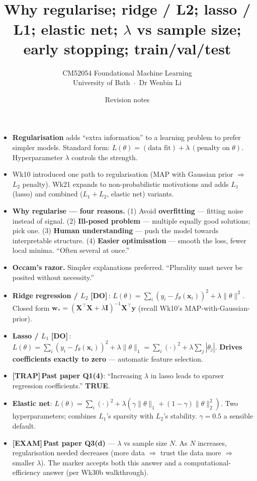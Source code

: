 \documentclass[11pt, a4paper]{article}
\title{\vspace{-1cm}{\Huge\bfseries Week 21 — Regularisation} \\[0.4em]{\large Why regularise; ridge / L2; lasso / L1; elastic net; $\lambda$ vs sample size; early stopping; train/val/test}}
\author{\large CM52054 Foundational Machine Learning \\[0.2em]\normalsize University of Bath \,$\cdot$\, Dr Wenbin Li}
\date{Revision notes}
\newcommand{\examflag}{\textcolor{tipBd}{\textbf{[EXAM]}}\,}
\newcommand{\trapflag}{\textcolor{trapBd}{\textbf{[TRAP]}}\,}
\newcommand{\doflag}{\textcolor{defBd}{\textbf{[DO]}}\,}
\begin{document}
\maketitle\thispagestyle{empty}\vspace{1em}

\begin{tldrbox}
\begin{itemize}[leftmargin=*]
  \item \textbf{Regularisation} adds ``extra information'' to a learning problem to prefer simpler models. Standard form: $L(\theta) = (\text{data fit}) + \lambda\,(\text{penalty on }\theta)$. Hyperparameter $\lambda$ controls the strength.
  \item Wk10 introduced one path to regularisation (MAP with Gaussian prior $\Rightarrow$ $L_2$ penalty). Wk21 expands to non-probabilistic motivations and adds $L_1$ (lasso) and combined ($L_1+L_2$, elastic net) variants.
  \item \textbf{Why regularise — four reasons.} (1) Avoid \textbf{overfitting} — fitting noise instead of signal. (2) \textbf{Ill-posed problem} — multiple equally good solutions; pick one. (3) \textbf{Human understanding} — push the model towards interpretable structure. (4) \textbf{Easier optimisation} — smooth the loss, fewer local minima. ``Often several at once.''
  \item \textbf{Occam's razor.} Simpler explanations preferred. ``Plurality must never be posited without necessity.''
  \item \textbf{Ridge regression / $L_2$} \doflag{}: $L(\theta) = \sum_i(y_i - f_\theta(\mathbf{x}_i))^2 + \lambda\|\theta\|^2$. Closed form $\mathbf{w}_* = (\mathbf{X}^\top\mathbf{X} + \lambda\mathbf{I})^{-1}\mathbf{X}^\top\mathbf{y}$ (recall Wk10's MAP-with-Gaussian-prior).
  \item \textbf{Lasso / $L_1$} \doflag{}: $L(\theta) = \sum_i(y_i - f_\theta(\mathbf{x}_i))^2 + \lambda\|\theta\|_1 = \sum_i(\cdot)^2 + \lambda\sum_j|\theta_j|$. \textbf{Drives coefficients exactly to zero} — automatic feature selection.
  \item \trapflag{}\textbf{Past paper Q1(4)}: ``Increasing $\lambda$ in lasso leads to sparser regression coefficients.'' \textbf{TRUE}.
  \item \textbf{Elastic net}: $L(\theta) = \sum_i(\cdot)^2 + \lambda(\gamma\|\theta\|_1 + (1-\gamma)\|\theta\|_2^2)$. Two hyperparameters; combines $L_1$'s sparsity with $L_2$'s stability. $\gamma=0.5$ a sensible default.
  \item \examflag{}\textbf{Past paper Q3(d)} — $\lambda$ vs sample size $N$. As $N$ increases, regularisation needed decreases (more data $\Rightarrow$ trust the data more $\Rightarrow$ smaller $\lambda$). The marker accepts both this answer and a computational-efficiency answer (per Wk30b walkthrough).

\end{itemize}
\end{tldrbox}
\end{document}
